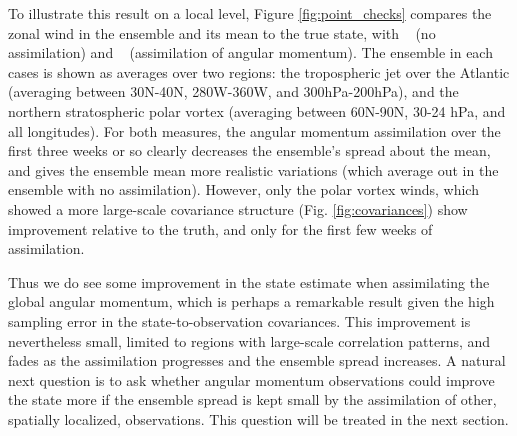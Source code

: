 To illustrate this result on a local level, Figure \ref{fig:point_checks} compares the zonal wind in the ensemble and its mean to the true state, with \NODA~ (no assimilation) and \ERPALL~ (assimilation of angular momentum). 
The ensemble in each cases is shown as averages over two regions: the tropospheric jet over the Atlantic (averaging between 30N-40N, 280W-360W, and 300hPa-200hPa), and the northern stratospheric polar vortex (averaging between 60N-90N, 30-24 hPa, and all longitudes).
For both measures, the angular momentum assimilation over the first three weeks or so clearly decreases the ensemble's spread about the mean, and gives the ensemble mean more realistic variations (which average out in the ensemble with no assimilation). 
However, only the polar vortex winds, which showed a more large-scale covariance structure (Fig. \ref{fig:covariances}) show improvement relative to the truth, and only for the first few weeks of assimilation. 

Thus we do see some improvement in the state estimate when assimilating the global angular momentum, which is perhaps a remarkable result given the high sampling error in the state-to-observation covariances. 
This improvement is nevertheless small, limited to regions with large-scale correlation patterns, and fades as the assimilation progresses and the ensemble spread increases.
A natural next question is to ask whether angular momentum observations could improve the state more if the ensemble spread is kept small by the assimilation of other, spatially localized, observations. 
This question will be treated in the next section.  
